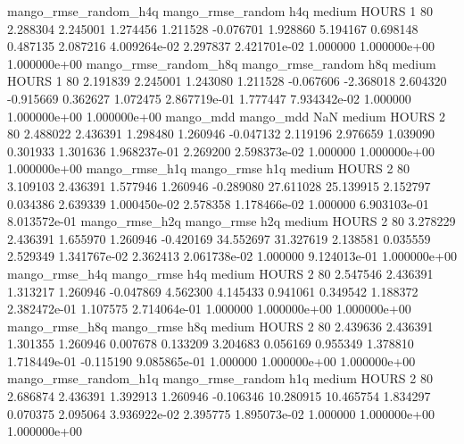 mango_rmse_random_h4q mango_rmse_random                  h4q     medium    HOURS                 1 80  2.288304       2.245001 1.274456       1.211528   -0.076701      1.928860      5.194167     0.698148       0.487135  2.087216 4.009264e-02     2.297837   2.421701e-02            1.000000    1.000000e+00        1.000000e+00
mango_rmse_random_h8q mango_rmse_random                  h8q     medium    HOURS                 1 80  2.191839       2.245001 1.243080       1.211528   -0.067606     -2.368018      2.604320    -0.915669       0.362627  1.072475 2.867719e-01     1.777447   7.934342e-02            1.000000    1.000000e+00        1.000000e+00
            mango_mdd         mango_mdd                  NaN     medium    HOURS                 2 80  2.488022       2.436391 1.298480       1.260946   -0.047132      2.119196      2.976659     1.039090       0.301933  1.301636 1.968237e-01     2.269200   2.598373e-02            1.000000    1.000000e+00        1.000000e+00
       mango_rmse_h1q        mango_rmse                  h1q     medium    HOURS                 2 80  3.109103       2.436391 1.577946       1.260946   -0.289080     27.611028     25.139915     2.152797       0.034386  2.639339 1.000450e-02     2.578358   1.178466e-02            1.000000    6.903103e-01        8.013572e-01
       mango_rmse_h2q        mango_rmse                  h2q     medium    HOURS                 2 80  3.278229       2.436391 1.655970       1.260946   -0.420169     34.552697     31.327619     2.138581       0.035559  2.529349 1.341767e-02     2.362413   2.061738e-02            1.000000    9.124013e-01        1.000000e+00
       mango_rmse_h4q        mango_rmse                  h4q     medium    HOURS                 2 80  2.547546       2.436391 1.313217       1.260946   -0.047869      4.562300      4.145433     0.941061       0.349542  1.188372 2.382472e-01     1.107575   2.714064e-01            1.000000    1.000000e+00        1.000000e+00
       mango_rmse_h8q        mango_rmse                  h8q     medium    HOURS                 2 80  2.439636       2.436391 1.301355       1.260946    0.007678      0.133209      3.204683     0.056169       0.955349  1.378810 1.718449e-01    -0.115190   9.085865e-01            1.000000    1.000000e+00        1.000000e+00
mango_rmse_random_h1q mango_rmse_random                  h1q     medium    HOURS                 2 80  2.686874       2.436391 1.392913       1.260946   -0.106346     10.280915     10.465754     1.834297       0.070375  2.095064 3.936922e-02     2.395775   1.895073e-02            1.000000    1.000000e+00        1.000000e+00
